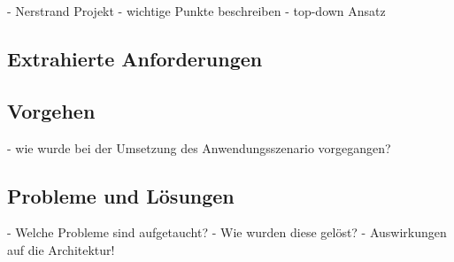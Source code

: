   - Nerstrand Projekt
  - wichtige Punkte beschreiben
  - top-down Ansatz

\subsection{Extrahierte Anforderungen} %
\label{sub:extrahierte_anforderungen}


\subsection{Vorgehen} %
\label{sub:vorgehen_szenario}

  - wie wurde bei der Umsetzung des Anwendungsszenario vorgegangen?


\subsection{Probleme und Lösungen} %
\label{sub:probleme_und_loesungen_szenario}

  - Welche Probleme sind aufgetaucht?
  - Wie wurden diese gelöst?
  - Auswirkungen auf die Architektur!



